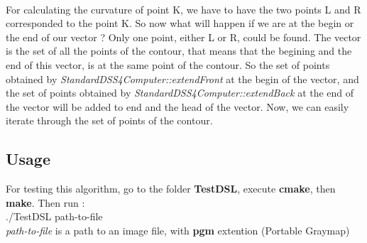 \paragraph{}
For calculating the curvature of point K, we have to have the two points L and R corresponded to the point K. So now what will happen if we are at the begin or the end of our vector ? Only one point, either L or R, could be found. The vector is the set of all the points of the contour, that means that the begining and the end of this vector, is at the same point of the contour. So the set of points obtained by \textit{StandardDSS4Computer::extendFront} at the begin of the vector, and the set of points obtained by \textit{StandardDSS4Computer::extendBack} at the end of the vector will be added to end and the head of the vector. Now, we can easily iterate through the set of points of the contour.

\subsection{Usage}
For testing this algorithm, go to the folder \textbf{TestDSL}, execute \textbf{cmake}, then \textbf{make}. Then run :\\
./TestDSL path-to-file \\
\textit{path-to-file} is a path to an image file, with \textbf{pgm} extention (Portable Graymap)





